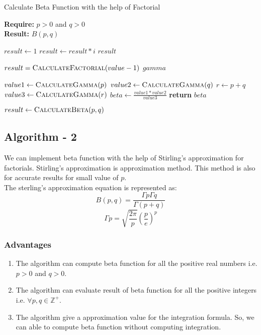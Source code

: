 \documentclass[12pt,report]{article}
\begin{document}
\begin{algorithm}[H]
\caption{Calculate Beta Function with the help of Factorial}
\textbf{Require:} $p > 0$ and $q > 0$ \\
\textbf{Result:} $B(p,q)$
\begin{algorithmic}
    \State $result \leftarrow 1$
    \State $result \leftarrow result * i$
    \EndFor
    \State\Return $result$ 
    \EndProcedure
\Statex

    \State $result = \Call{CalculateFactorial}{value-1}$
    \State\Return $gamma$
    \EndProcedure
\Statex

    \State $value1 \leftarrow \Call{CalculateGamma}{p}$
    \State $value2 \leftarrow \Call{CalculateGamma}{q}$
    \State $r \leftarrow p+q$
    \State $value3 \leftarrow \Call{CalculateGamma}{r}$
    \State $beta \leftarrow \frac{value1 * value2}{value3}$
    \State \textbf{return} $beta$
    \EndProcedure
\Statex

\State $result \leftarrow \Call{CalculateBeta}{p,q} $
\end{algorithmic}
\end{algorithm}

\subsection{Algorithm - 2}
We can implement beta function with the help of Stirling's approximation for factorials. Stirling's approximation is approximation method. This method is also for accurate results for small value of $p$.\\
The sterling's approximation equation is represented as:
\[B(p,q) = \frac{\Gamma p \Gamma q}{\Gamma (p+q)}\]
\[\Gamma p = \sqrt{\frac{2\pi}{p}}(\frac{p}{e})^p\]

\subsubsection{Advantages}
\begin{enumerate}
    \item The algorithm can compute beta function for all the positive real numbers i.e. $p > 0$ and $q > 0$.
    \item The algorithm can evaluate result of beta function for all the positive integers i.e. $\forall p,q \in \mathbb Z^+$.
    \item The algorithm give a approximation value for the integration formula. So, we can able to compute beta function without computing integration.
\end{enumerate}
\end{document}
